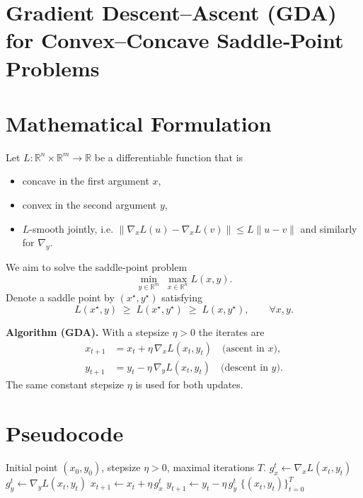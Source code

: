 \documentclass{article}
\newcommand{\grad}{\nabla}
\begin{document}
\section*{Gradient Descent–Ascent (GDA) for Convex–Concave Saddle‑Point Problems}

\section*{Mathematical Formulation}
Let $L:\mathbb{R}^{n}\times\mathbb{R}^{m}\rightarrow\mathbb{R}$ be a differentiable function that is
\begin{itemize}
    \item concave in the first argument $x$,
    \item convex   in the second argument $y$,
    \item $L$-smooth jointly, i.e. $\|\grad_{x}L(u)-\grad_{x}L(v)\|\le L\|u-v\|$ and similarly for $\grad_{y}$.
\end{itemize}
We aim to solve the saddle‑point problem
\[
\min_{y\in\mathbb{R}^{m}}\;\max_{x\in\mathbb{R}^{n}} L(x,y).
\]
Denote a saddle point by $(x^{\star},y^{\star})$ satisfying
\[
L(x^{\star},y)\;\ge\;L(x^{\star},y^{\star})\;\ge\;L(x,y^{\star}),\qquad\forall x,y.
\]

\bigskip
\textbf{Algorithm (GDA).}  With a stepsize $\eta>0$ the iterates are
\begin{align}
x_{t+1}&=x_{t}+\eta\,\grad_{x}L(x_{t},y_{t})\quad\text{(ascent in $x$)},\label{eq:update_x}\\
y_{t+1}&=y_{t}-\eta\,\grad_{y}L(x_{t},y_{t})\quad\text{(descent in $y$)}.\label{eq:update_y}
\end{align}
The same constant stepsize $\eta$ is used for both updates.

\section*{Pseudocode}
\begin{algorithm}[H]
\caption{Gradient Descent–Ascent (GDA)}
\begin{algorithmic}[1]
\Require Initial point $(x_{0},y_{0})$, stepsize $\eta>0$, maximal iterations $T$.
    \State $g_{x}^{t}\gets \grad_{x}L(x_{t},y_{t})$
    \State $g_{y}^{t}\gets \grad_{y}L(x_{t},y_{t})$
    \State $x_{t+1}\gets x_{t}+\eta\,g_{x}^{t}$ 
    \State $y_{t+1}\gets y_{t}-\eta\,g_{y}^{t}$ 
\EndFor
\State \Return $\{(x_{t},y_{t})\}_{t=0}^{T}$
\end{algorithmic}
\end{algorithm}
\end{document}

